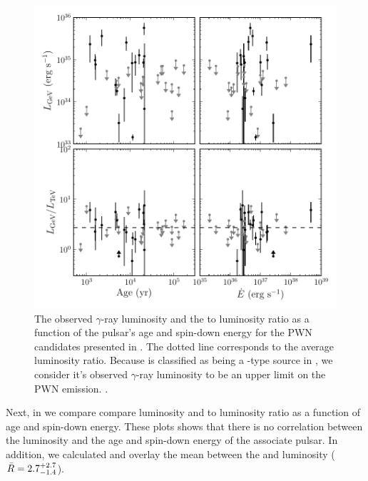 \begin{figure}[htbp]
  \centering
  \includegraphics{chapters/population_study/figures/pwn_age_edot_vs_l_gev.pdf}
  \caption{The observed $\gamma$-ray luminosity and the
  \gev to \tev luminosity ratio as a
  function of the pulsar's age and spin-down energy
  for the \ac{PWN} candidates presented in
  .  The dotted line
  corresponds to the average luminosity ratio.  Because 
  is classified as being a \PSRClass-type source in ,
  we consider it's observed $\gamma$-ray luminosity to be an upper limit
  on the \ac{PWN} emission.  .}
\end{figure}

Next, in  we compare compare \gev
luminosity and \gev to \tev luminosity ratio as a function of age and
spin-down energy.  These plots shows that there is no correlation between
the \gev luminosity and the age and spin-down energy of the associate
pulsar.  In addition, we calculated and overlay the mean between the
\gev and \tev luminosity ($\bar{R}=2.7_{-1.4}^{+2.7}$).



